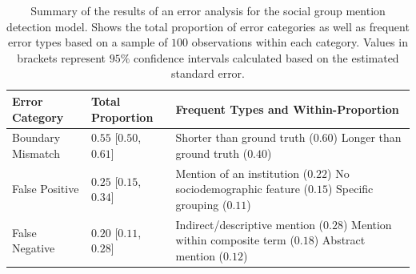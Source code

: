 \begin{table}[ht]
\centering
\begin{tabular}{l l l}
\toprule
Error Category & Total Proportion & Frequent Types and Within-Proportion  \\
\midrule
Boundary Mismatch & $0.55$ [$0.50$, $0.61$] & \makecell[l]{Shorter than ground truth ($0.60$)\\Longer than ground truth ($0.40$)} \\
\addlinespace
\midrule
False Positive & $0.25$ [$0.15$, $0.34$] & \makecell[l]{Mention of an institution ($0.22$)\\No sociodemographic feature ($0.15$)\\Specific grouping ($0.11$)} \\
\addlinespace
\midrule
False Negative & $0.20$ [$0.11$, $0.28$] & \makecell[l]{Indirect/descriptive mention ($0.28$)\\Mention within composite term ($0.18$)\\Abstract mention ($0.12$)} \\
\bottomrule
\end{tabular}
\caption[Error analysis for social group mention detection model]{Summary of the results of an error analysis for the social group mention detection model. Shows the total proportion of error categories as well as frequent error types based on a sample of $100$ observations within each category. Values in brackets represent $95\%$ confidence intervals calculated based on the estimated standard error.}
\label{tab:error_analysis_group_mention_detection}
\end{table}